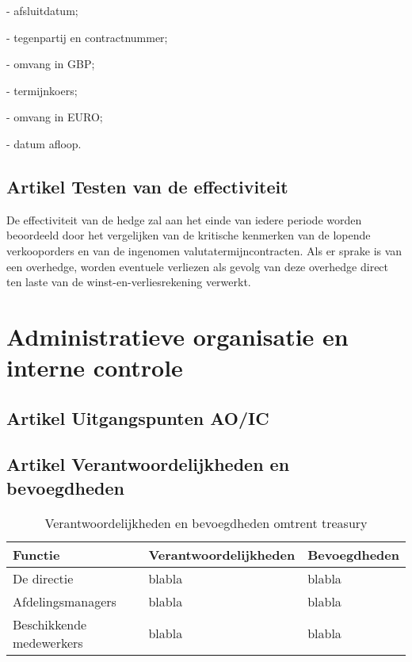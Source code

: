 - afsluitdatum;

- tegenpartij en contractnummer;

- omvang in GBP;

- termijnkoers;

- omvang in EURO;

- datum afloop.


\subsection*{Artikel \theartikel \hspace{1em} Testen van de effectiviteit}
De effectiviteit van de hedge zal aan het einde van iedere periode worden beoordeeld door het vergelijken van de kritische kenmerken van de lopende verkooporders en van de ingenomen valutatermijncontracten. Als er sprake is van een overhedge, worden eventuele verliezen als gevolg van deze overhedge direct ten laste van de winst-en-verliesrekening verwerkt.



\newpage
\section*{Administratieve organisatie en interne controle}
\subsection*{Artikel \theartikel \hspace{1em} Uitgangspunten AO/IC}


\subsection*{Artikel \theartikel \hspace{1em} Verantwoordelijkheden en bevoegdheden}

\begin{table}[!h]
    \centering
    \caption{Verantwoordelijkheden en bevoegdheden omtrent treasury}
    \begin{tabular}{l l l}
        \toprule
        \textbf{Functie} & \textbf{Verantwoordelijkheden} & \textbf{Bevoegdheden} \\
        \midrule
        De directie & blabla & blabla \\
        Afdelingsmanagers & blabla & blabla \\
        Beschikkende medewerkers & blabla & blabla \\
        \bottomrule
    \end{tabular}
    \label{tab:functiescheiding}
\end{table}


